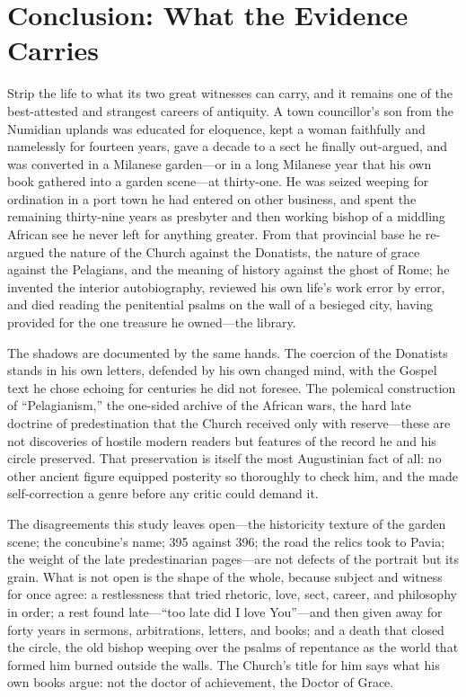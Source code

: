 \section{Conclusion: What the Evidence Carries}

Strip the life to what its two great witnesses can carry, and it remains
one of the best-attested and strangest careers of antiquity. A town
councillor's son from the Numidian uplands was educated for eloquence, kept
a woman faithfully and namelessly for fourteen years, gave a decade to a
sect he finally out-argued, and was converted in a Milanese garden---or in
a long Milanese year that his own book gathered into a garden scene---at
thirty-one. He was seized weeping for ordination in a port town he had
entered on other business, and spent the remaining thirty-nine years as
presbyter and then working bishop of a middling African see he never left
for anything greater. From that provincial base he re-argued the nature of the Church
against the Donatists, the nature of grace against the Pelagians, and the
meaning of history against the ghost of Rome; he invented the interior
autobiography, reviewed his own life's work error by error, and died
reading the penitential psalms on the wall of a besieged city, having
provided for the one treasure he owned---the library.

The shadows are documented by the same hands. The coercion of the
Donatists stands in his own letters, defended by his own changed mind, with
the Gospel text he chose echoing for centuries he did not foresee. The
polemical construction of ``Pelagianism,'' the one-sided archive of the
African wars, the hard late doctrine of predestination that the Church
received only with reserve---these are not discoveries of hostile modern
readers but features of the record he and his circle preserved. That
preservation is itself the most Augustinian fact of all: no other ancient
figure equipped posterity so thoroughly to check him, and the
 made self-correction a genre before any critic could
demand it.

The disagreements this study leaves open---the historicity texture of the
garden scene; the concubine's name; 395 against 396; the road the relics
took to Pavia; the weight of the late predestinarian pages---are not
defects of the portrait but its grain. What is not open is the shape of
the whole, because subject and witness for once agree: a restlessness that
tried rhetoric, love, sect, career, and philosophy in order; a rest found
late---``too late did I love You''---and then given away for forty years
in sermons, arbitrations, letters, and books; and a death that closed the
circle, the old bishop weeping over the psalms of repentance as the world
that formed him burned outside the walls. The Church's title for him says
what his own books argue: not the doctor of achievement, the Doctor of
Grace.
